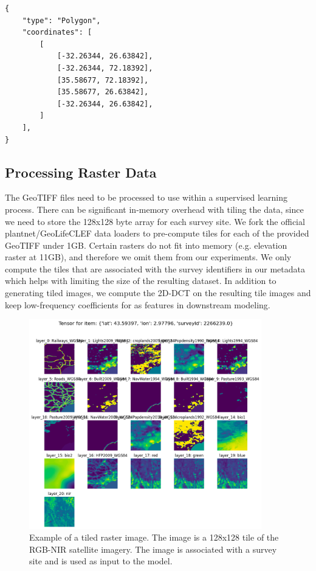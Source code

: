 \documentclass[]{style/ceurart}
\begin{document}
\begin{lstlisting}[caption={GeoJSON polygon for region specified by GeoLifeCLEF 2024.}, captionpos=b,label={lst:polygon}]
  {
    "type": "Polygon",
    "coordinates": [
        [
            [-32.26344, 26.63842],
            [-32.26344, 72.18392],
            [35.58677, 72.18392],
            [35.58677, 26.63842],
            [-32.26344, 26.63842],
        ]
    ],
}
\end{lstlisting}

\subsection{Processing Raster Data}

The GeoTIFF files need to be processed to use within a supervised learning process. 
There can be significant in-memory overhead with tiling the data, since we need to store the 128x128 byte array for each survey site. 
We fork the official plantnet/GeoLifeCLEF data loaders to pre-compute tiles for each of the provided GeoTIFF under 1GB. 
Certain rasters do not fit into memory (e.g. elevation raster at 11GB), and therefore we omit them from our experiments. 
We only compute the tiles that are associated with the survey identifiers in our metadata which helps with limiting the size of the resulting dataset. 
In addition to generating tiled images, we compute the 2D-DCT on the resulting tile images and keep low-frequency coefficients for as features in downstream modeling. 

\begin{figure}
    \centering
    \includegraphics[width=0.9\textwidth]{figures/tiled-raster.png}
    \caption{
        Example of a tiled raster image. 
        The image is a 128x128 tile of the RGB-NIR satellite imagery. 
        The image is associated with a survey site and is used as input to the model. 
    }
    \label{fig:tiled-raster}
\end{figure}
\end{document}
